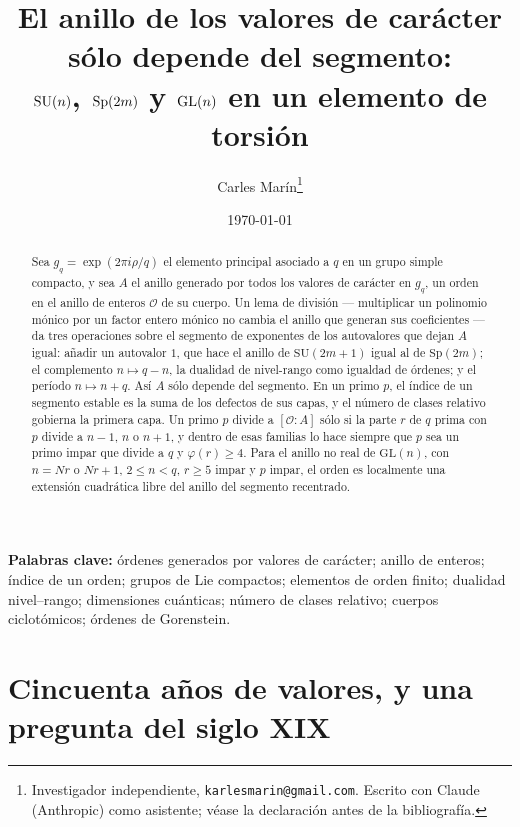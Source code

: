 \documentclass[11pt,a4paper]{article}
\title{\vspace{-1.4cm}\Large El anillo de los valores de car\'acter s\'olo depende del segmento:\\
$\SU(n)$, $\Sp(2m)$ y $\GL(n)$ en un elemento de torsi\'on}
\author{\normalsize Carles Mar\'in\thanks{Investigador independiente,
\texttt{karlesmarin@gmail.com}. Escrito con Claude (Anthropic) como asistente; v\'ease la
declaraci\'on antes de la bibliograf\'ia.}}
\date{\normalsize\today}
\theoremstyle{definition}
\newcommand{\Sp}{\mathrm{Sp}}
\newcommand{\SU}{\mathrm{SU}}
\newcommand{\GL}{\mathrm{GL}}
\newcommand{\cO}{\mathcal{O}}
\begin{document}
\maketitle

\begin{abstract}
\noindent
Sea $g_q=\exp(2\pi i\rho/q)$ el elemento principal asociado a $q$ en un grupo simple compacto, y
sea $A$ el anillo generado por todos los valores de car\'acter en $g_q$, un orden en el anillo de
enteros $\cO$ de su cuerpo. Un lema de divisi\'on --- multiplicar un polinomio m\'onico por un
factor entero m\'onico no cambia el anillo que generan sus coeficientes --- da tres operaciones
sobre el segmento de exponentes de los autovalores que dejan $A$ igual: a\~nadir un autovalor $1$,
que hace el anillo de $\SU(2m+1)$ igual al de $\Sp(2m)$; el complemento $n\mapsto q-n$, la dualidad
de nivel-rango como igualdad de \'ordenes; y el per\'iodo $n\mapsto n+q$. As\'i $A$ s\'olo depende
del segmento. En un primo $p$, el \'indice de un segmento estable es la suma de los defectos de
sus capas, y el n\'umero de clases relativo gobierna la primera capa. Un primo $p$ divide a
$[\cO:A]$ s\'olo si la parte $r$ de $q$ prima con $p$ divide a $n-1$, $n$ o $n+1$, y dentro de esas
familias lo hace siempre que $p$ sea un primo impar que divide a $q$ y $\varphi(r)\ge4$. Para el anillo no real de $\GL(n)$, con
$n=Nr$ o $Nr+1$, $2\le n<q$, $r\ge5$ impar y $p$ impar, el orden es localmente una extensi\'on
cuadr\'atica libre del anillo del segmento recentrado.
\end{abstract}

\noindent\textbf{Palabras clave:} \'ordenes generados por valores de car\'acter; anillo de enteros;
\'indice de un orden; grupos de Lie compactos; elementos de orden finito; dualidad nivel--rango;
dimensiones cu\'anticas; n\'umero de clases relativo; cuerpos ciclot\'omicos; \'ordenes de
Gorenstein.

\section{Cincuenta a\~nos de valores, y una pregunta del siglo XIX}
\end{document}
